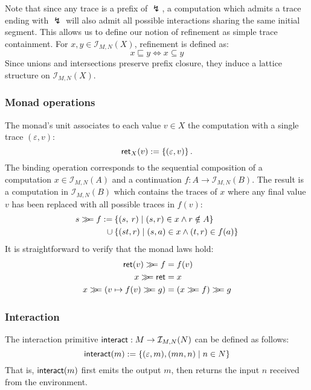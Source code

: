 Note that since any trace is a prefix of $\lightning$,
a computation which admits a trace ending with $\lightning$
will also admit all possible interactions
sharing the same initial segment. 
This allows us to define our notion of refinement
as simple trace containment.
For $x, y \in \mathcal{I}_{M,N}(X)$, refinement is defined as:
\[
    x \sqsubseteq y \Leftrightarrow x \subseteq y
\]
Since unions and intersections
preserve prefix closure,
they induce a lattice structure on $\mathcal{I}_{M,N}(X)$.


\subsubsection{Monad operations} %

The monad's unit associates to each value $v \in X$
the computation with a single trace $(\varepsilon, v)$:
\[
     \mathsf{ret} _X(v) := \{ (\varepsilon, v) \} \,.
\]
The binding operation corresponds to
the sequential composition of
a computation $x \in \mathcal{I}_{M,N}(A)$ and
a continuation $f : A \rightarrow \mathcal{I}_{M,N}(B)$.
The result is a computation in $\mathcal{I}_{M,N}(B)$ which
contains the traces of $x$ where
any final value $v$ has been replaced with
all possible traces in $f(v)$:
\begin{align*}
    s \gg\!\!= f := &\:\{ (s, \: r) \mid (s, r) \in x \wedge r \notin A \} \\
      \cup &\:\{ (st, r) \mid (s, a) \in x \wedge (t, r) \in f(a) \}
\end{align*}
It is straightforward to verify that
the monad laws hold:
\begin{align*}
  \kw{ret}(v) \bind f &= f(v) \\
  x \bind \kw{ret} &= x \\
  x \bind (v \mapsto f(v) \bind g) &= (x \bind f) \bind g
\end{align*}


\subsubsection{Interaction} %

The interaction primitive
$ \mathsf{interact}  : M \rightarrow \mathcal{I}_{M,N}(N)$
can be defined as follows:
\[
     \mathsf{interact} (m) := \{ (\varepsilon, m), (mn, n) \mid n \in N \}
\]
That is,
$ \mathsf{interact} (m)$ first emits the output $m$,
then returns the input $n$ received from the environment.


